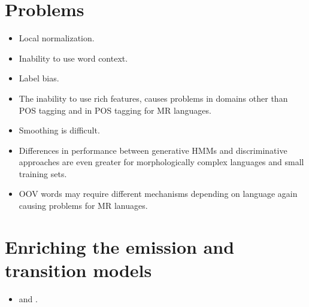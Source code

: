 \section{Problems}
\begin{itemize}
\item Local normalization.
\item Inability to use word context.
\item Label bias.
\item The inability to use rich features, causes problems in domains
  other than POS tagging and in POS tagging for MR languages.
\item Smoothing is difficult.
\item Differences in performance between generative HMMs and
  discriminative approaches are even greater for morphologically
  complex languages and small training sets.
\item OOV words may require different mechanisms depending on
  language again causing problems for MR lanuages.
\end{itemize}

\section{Enriching the emission and transition models}
\begin{itemize}
\item \cite{Halacsy2007} and \cite{Silfverberg2011}.
\end{itemize}
